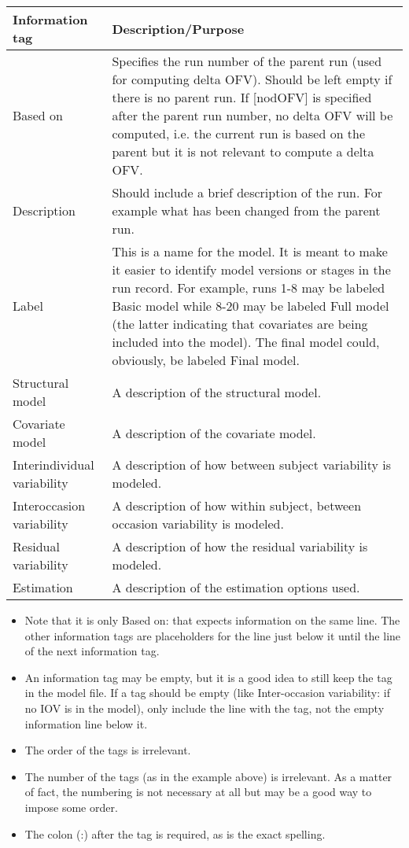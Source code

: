 \begin{longtable}{p{3cm}p{9.5cm}}
\hline
Information tag & Description/Purpose \\
\hline
Based on & Specifies the run number of the parent run (used for computing delta OFV). Should be left empty if there is no parent run. If [nodOFV] is specified after the parent run number, no delta OFV will be computed, i.e. the current run is based on the parent but it is not relevant to compute a delta OFV.\\
\hline
Description & Should include a brief description of the run. For example what has been changed from the parent run. \\
\hline
Label & This is a name for the model. It is meant to make it easier to identify model versions or stages in the run record. For example, runs 1-8 may be labeled Basic model while 8-20 may be labeled Full model (the latter indicating that covariates are being included into the model). The final model could, obviously, be labeled Final model. \\
\hline
Structural model & A description of the structural model. \\
\hline
Covariate model & A description of the covariate model. \\
\hline
Interindividual variability & A description of how between subject variability is modeled. \\
\hline
Interoccasion variability & A description of how within subject, between occasion variability is modeled. \\
\hline
Residual \mbox{variability} & A description of how the residual variability is modeled. \\
\hline
Estimation & A description of the estimation options used. \\
\hline
\end{longtable}

\begin{itemize}
\item Note that it is only Based on: that expects information on the same line. The other information tags are placeholders for the line just below it until the line of the next information tag.
\item An information tag may be empty, but it is a good idea to still keep the tag in the model file.  If a tag should be empty (like Inter-occasion variability: if no IOV is in the model), only include the line with the tag, not the empty information line below it.
\item The order of the tags is irrelevant.
\item The number of the tags (as in the example above) is irrelevant. As a matter of fact, the numbering is not necessary at all but may be a good way to impose some order.
\item The colon (:) after the tag is required, as is the exact spelling.
\end{itemize}
